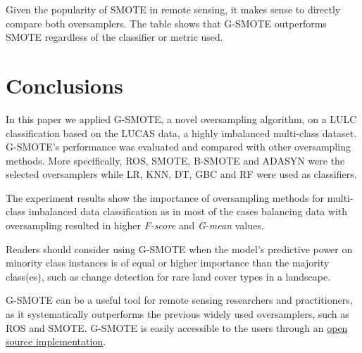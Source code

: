 \documentclass[remotesensing,article,submit,moreauthors,pdftex]{Definitions/mdpi}
\begin{document}
Given the popularity of SMOTE in remote sensing, it makes sense to directly
compare both oversamplers. The table shows that G-SMOTE outperforms SMOTE
regardless of the classifier or metric used.

\section{Conclusions}

In this paper we applied G-SMOTE, a novel oversampling algorithm, on a LULC
classification based on the LUCAS data, a highly imbalanced multi-class dataset.
G-SMOTE's performance was evaluated and compared with other oversampling
methods. More specifically, ROS, SMOTE, B-SMOTE and ADASYN were the selected
oversamplers while LR, KNN, DT, GBC and RF were used as classifiers.

The experiment results show the importance of oversampling methods for
multi-class imbalanced data classification as in most of the cases balancing
data with oversampling resulted in higher \textit{F-score} and \textit{G-mean}
values.

Readers should consider using G-SMOTE when the model’s predictive power on
minority class instances is of equal or higher importance than the majority
class(es), such as change detection for rare land cover types in a landscape.

G-SMOTE can be a useful tool for remote sensing researchers and practitioners,
as it systematically outperforms the previous widely used oversamplers, such as
ROS and SMOTE. G-SMOTE is easily accessible to the users through an
\href{https://geometric-smote.readthedocs.io/en/latest/?badge=latest}{open
source implementation}.

\vspace{6pt}




\end{document}
